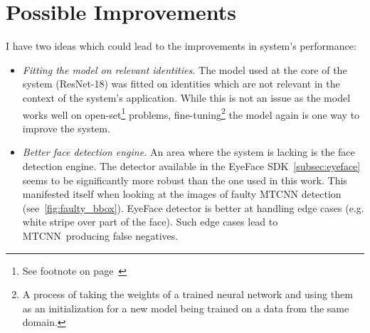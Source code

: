 \section{Possible Improvements}\label{sec:possible-improvements}
I have two ideas which could lead to the improvements in system's performance:
\begin{itemize}
    \item \textit{Fitting the model on relevant identities.} The model used at the core of the system (ResNet-18) was
    fitted on identities which are not relevant in the context of the system's application.
    While this is not an issue as the model works well on open-set\footnote{See footnote on page~\pageref{foot:openset}}
    problems, fine-tuning\footnote{A process of taking the weights of a trained neural network and using them as
    an initialization for a new model being trained on a data from the same domain.} the model again is one way to
    improve the system.
    \item \textit{Better face detection engine.} An area where the system is lacking is the face detection engine.
    The detector available in the EyeFace SDK~\ref{subsec:eyeface} seems to be significantly more robust than the one
    used in this work.
    This manifested itself when looking at the images of faulty MTCNN detection (see~\ref{fig:faulty_bbox}).
    EyeFace detector is better at handling edge cases (e.g. white stripe over part of the face).
    Such edge cases lead to MTCNN producing false negatives.
\end{itemize}